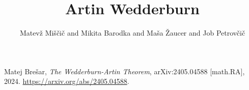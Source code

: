\documentclass[a4paper]{article}
\title{Artin Wedderburn}
\author{Matevž Miščič and Mikita Barodka and Maša Žaucer and Job Petrovčič}
\begin{document}
\maketitle


\begin{thebibliography}{99}

    Matej Brešar, 
    \textit{The Wedderburn-Artin Theorem}, 
    arXiv:2405.04588 [math.RA], 2024. 
    \url{https://arxiv.org/abs/2405.04588}.
    
    \end{thebibliography}
\end{document}
